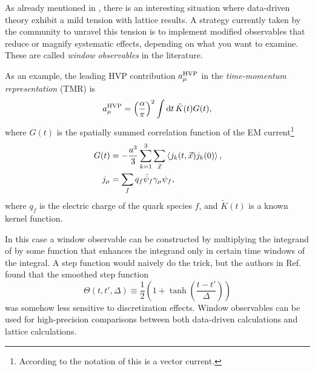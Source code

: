 As already mentioned in , there is an interesting situation
where data-driven theory exhibit a mild tension with lattice results.
A strategy currently taken by the community to unravel this tension is to
implement modified observables that reduce or magnify systematic effects,
depending on what you want to examine. These are called {\it window observables}
in the literature.

As an example, the leading HVP contribution $a_\mu^{\rm HVP}$ in the
{\it time-momentum representation} (TMR) is~\cite{bernecker_vector_2011}
\begin{equation}\label{eq:amuhvp}
  a_\mu^{\rm HVP}=\left(\frac{\alpha}{\pi}\right)^2\int\dd{t}\tilde{K}(t)G(t),
\end{equation}
where $G(t)$ is the spatially summed correlation function of the EM 
current\footnote{According to the notation of 
this is a vector current.}
\begin{equation}\begin{aligned}
  G(t) &=-\frac{a^3}{3}\sum_{k=1}^3\sum_{\vec{x}}\ev{j_k(t,\vec{x})j_k(0)},\\
  j_\mu&=\sum_fq_f\bar{\psi}_f\gamma_\mu\psi_f,
\end{aligned}\end{equation}
where $q_f$ is the electric charge of the quark species $f$,
and $\tilde{K}(t)$ is a known kernel function.

In this case a window observable
can be constructed by multiplying the integrand of  by some
function that enhances the integrand only in certain time windows of the
integral. A step function would naively do the trick, but the authors
in Ref.~\cite{blum_calculation_2018} found that the smoothed step function
\begin{equation}
  \Theta(t,t',\Delta)\equiv\frac{1}{2}\left(1+\tanh\left(\frac{t-t'}{\Delta}\right)\right)
\end{equation}
was somehow less sensitive to discretization effects.
Window observables can be used for high-precision comparisons between both
data-driven calculations and lattice calculations.



